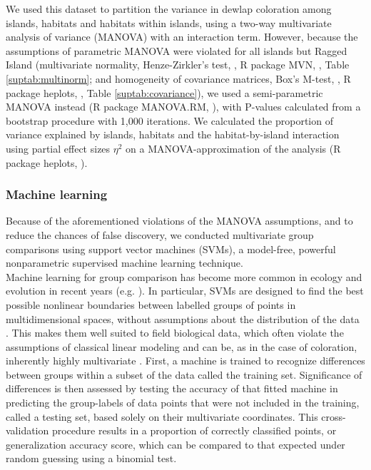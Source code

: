 We used this dataset to partition the variance in dewlap coloration among islands, habitats and habitats within islands, using a two-way multivariate analysis of variance (MANOVA) with an interaction term. However, because the assumptions of parametric MANOVA were violated for all islands but Ragged Island (multivariate normality, Henze-Zirkler's test, \citealt{Henze1990}, R package MVN, \citealt{Korkmaz2014}, Table \ref{suptab:multinorm}; and homogeneity of covariance matrices, Box's M-test, \citealt{Box1949, Morrison1988}, R package heplots, \citealt{Fox2018}, Table \ref{suptab:covariance}), we used a semi-parametric MANOVA instead (R package MANOVA.RM, \citealt{Friedrich2018}), with P-values calculated from a bootstrap procedure with 1,000 iterations. We calculated the proportion of variance explained by islands, habitats and the habitat-by-island interaction using partial effect sizes $\eta^2$ on a MANOVA-approximation of the analysis (R package heplots, \citealt{Fox2018}).

\subsubsection*{Machine learning}


Because of the aforementioned violations of the MANOVA assumptions, and to reduce the chances of false discovery, we conducted multivariate group comparisons using support vector machines (SVMs), a model-free, powerful nonparametric supervised machine learning technique.\\


Machine learning for group comparison has become more common in ecology and evolution in recent years (e.g. \citealt{Pigot2020}). In particular, SVMs are designed to find the best possible nonlinear boundaries between labelled groups of points in multidimensional spaces, without assumptions about the distribution of the data \citep{Cortes1995, Cristianini2000, Kim2018}. This makes them well suited to field biological data, which often violate the assumptions of classical linear modeling \citep{Kim2018} and can be, as in the case of coloration, inherently highly multivariate \citep{Cuthill1999}. First, a machine is trained to recognize differences between groups within a subset of the data called the training set. Significance of differences is then assessed by testing the accuracy of that fitted machine in predicting the group-labels of data points that were not included in the training, called a testing set, based solely on their multivariate coordinates. This cross-validation procedure results in a proportion of correctly classified points, or generalization accuracy score, which can be compared to that expected under random guessing using a binomial test.\\

